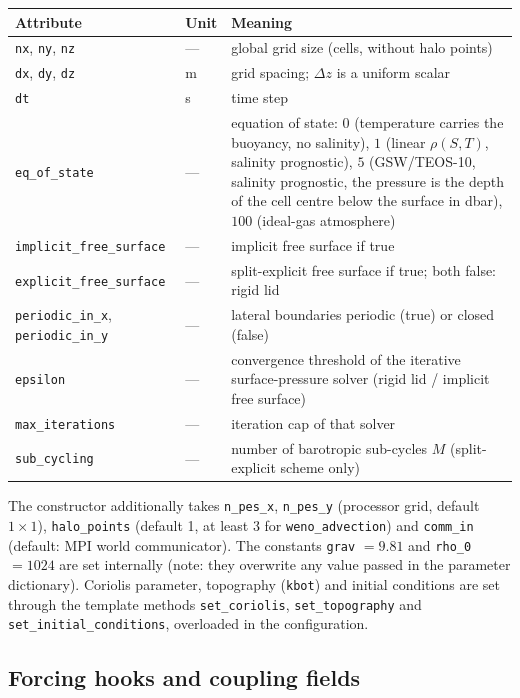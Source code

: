 \documentclass[12pt]{article}
\begin{document}
\begin{longtable}{@{}llp{8.4cm}@{}}
\hline
Attribute & Unit & Meaning \\
\hline
\endhead
\verb|nx|, \verb|ny|, \verb|nz| & --- & global grid size (cells, without halo
  points) \\
\verb|dx|, \verb|dy|, \verb|dz| & m & grid spacing; $\Delta z$ is a uniform
  scalar \\
\verb|dt| & s & time step \\
\verb|eq_of_state| & --- & equation of state: $0$ (temperature carries the
  buoyancy, no salinity), $1$ (linear $\rho(S,T)$, salinity prognostic),
  $5$ (GSW/TEOS-10, salinity prognostic, the pressure is the depth of the
  cell centre below the surface in dbar), $100$ (ideal-gas atmosphere) \\
\verb|implicit_free_surface| & --- & implicit free surface if true \\
\verb|explicit_free_surface| & --- & split-explicit free surface if true;
  both false: rigid lid \\
\verb|periodic_in_x|, \verb|periodic_in_y| & --- & lateral boundaries
  periodic (true) or closed (false) \\
\verb|epsilon| & --- & convergence threshold of the iterative surface-pressure
  solver (rigid lid / implicit free surface) \\
\verb|max_iterations| & --- & iteration cap of that solver \\
\verb|sub_cycling| & --- & number of barotropic sub-cycles $M$ (split-explicit
  scheme only) \\
\hline
\end{longtable}

\noindent
The constructor additionally takes \verb|n_pes_x|, \verb|n_pes_y| (processor
grid, default $1 \times 1$), \verb|halo_points| (default 1, at least 3 for
\verb|weno_advection|) and
\verb|comm_in| (default: MPI world communicator). The constants
\verb|grav| $=9.81$ and \verb|rho_0| $=1024$ are set internally (note: they
overwrite any value passed in the parameter dictionary). Coriolis parameter,
topography (\verb|kbot|) and initial conditions are set through the template
methods \verb|set_coriolis|, \verb|set_topography| and
\verb|set_initial_conditions|, overloaded in the configuration.

\subsection*{Forcing hooks and coupling fields}
\end{document}
